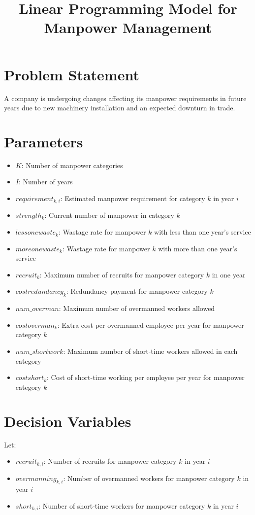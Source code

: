 \documentclass{article}
\begin{document}
\title{Linear Programming Model for Manpower Management}
\author{}
\date{}
\maketitle

\section*{Problem Statement}
A company is undergoing changes affecting its manpower requirements in future years due to new machinery installation and an expected downturn in trade.

\section*{Parameters}
\begin{itemize}
    \item $K$: Number of manpower categories
    \item $I$: Number of years
    \item $requirement_{k, i}$: Estimated manpower requirement for category $k$ in year $i$
    \item $strength_{k}$: Current number of manpower in category $k$
    \item $lessonewaste_{k}$: Wastage rate for manpower $k$ with less than one year's service
    \item $moreonewaste_{k}$: Wastage rate for manpower $k$ with more than one year's service
    \item $recruit_{k}$: Maximum number of recruits for manpower category $k$ in one year
    \item $costredundancy_{k}$: Redundancy payment for manpower category $k$
    \item $num\_overman$: Maximum number of overmanned workers allowed
    \item $costoverman_{k}$: Extra cost per overmanned employee per year for manpower category $k$
    \item $num\_shortwork$: Maximum number of short-time workers allowed in each category
    \item $costshort_{k}$: Cost of short-time working per employee per year for manpower category $k$
\end{itemize}

\section*{Decision Variables}
Let:
\begin{itemize}
    \item $recruit_{k, i}$: Number of recruits for manpower category $k$ in year $i$
    \item $overmanning_{k, i}$: Number of overmanned workers for manpower category $k$ in year $i$
    \item $short_{k, i}$: Number of short-time workers for manpower category $k$ in year $i$
\end{itemize}
\end{document}
